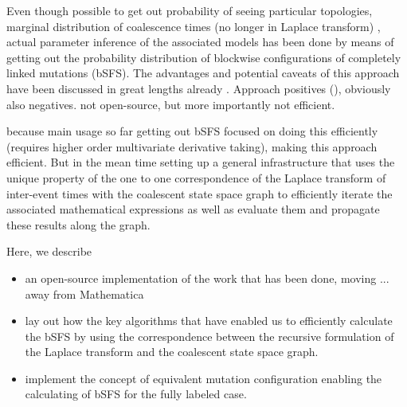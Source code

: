 \documentclass[10pt, a4]{article}
\begin{document}
Even though possible to get out probability of seeing particular topologies, marginal distribution of coalescence times (no longer in Laplace transform) \citep{Bisschop2021}, actual parameter inference of the associated models has been done by means of getting out the probability distribution of blockwise configurations of completely linked mutations (bSFS). The advantages and potential caveats of this approach have been discussed in great lengths already \citep{Lohhse2011, Lohse2016, Bisschop2021}. Approach positives (), obviously also negatives. 
not open-source, but more importantly not efficient.

because main usage so far getting out bSFS focused on doing this efficiently (requires higher order multivariate derivative taking), making this approach efficient. But in the mean time setting up a general infrastructure that uses the unique property of the one to one correspondence of the Laplace transform of inter-event times with the coalescent state space graph to efficiently iterate the associated mathematical expressions as well as evaluate them and propagate these results along the graph.


Here, we describe 
\begin{itemize}
\item an open-source implementation of the work that has been done, moving ... away from Mathematica \\
\item lay out how the key algorithms that have enabled us to efficiently calculate the bSFS by using the correspondence between the recursive formulation of the Laplace transform and the coalescent state space graph. %
\item implement the concept of equivalent mutation configuration enabling the calculating of bSFS for the fully labeled case.
\end{itemize}
\end{document}
